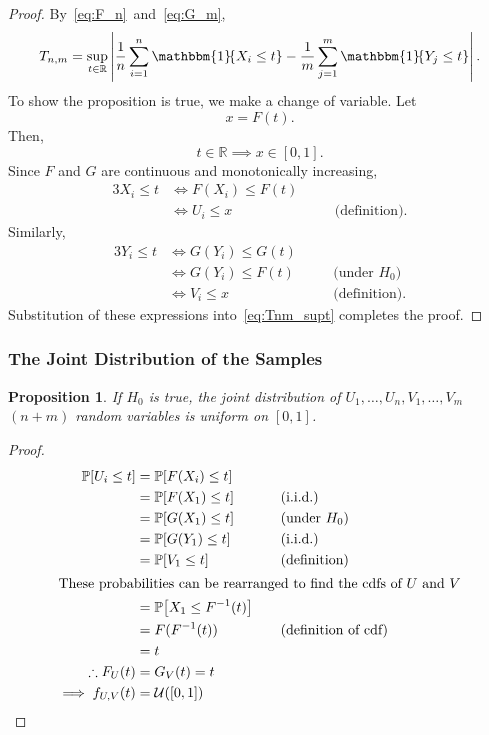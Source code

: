 \documentclass[letterpaper, reqno]{amsart}
\newtheorem{prop}{Proposition}[section]
\numberwithin{equation}{section}
\newcommand{\Prob}[1]{\mathbb{P}\mleft[#1\mright]}
\newcommand{\R}{\mathbb{R}}  %
\newcommand{\U}[2]{\mathcal{U}\mleft(\mleft[ #1, #2 \mright]\mright)}
\newcommand{\indic}[1]{\mathbbm{1}\!\mleft\{#1\mright\}} %
\newcommand{\iid}{i.i.d.}
\newcommand{\sumi}[2]{\sum_{#1=1}^{#2}}
\newcommand{\avg}[2]{\frac{1}{#2}\sumi{#1}{#2}}
\newcommand{\by}[1]{&\quad&\text{(#1)}}
\begin{document}
\begin{proof}
  By~\eqref{eq:F_n}~and~\eqref{eq:G_m},
  \begin{equation} \label{eq:Tnm_supt}
    T_{n,m} = \sup_{t \in \R} \left| \avg{i}{n} \indic{X_i \le t} - \avg{j}{m} \indic{Y_j \le t} \right|.
  \end{equation}
  To show the proposition is true, we make a change of variable. Let
    \[ x = F(t). \]
  Then,
    \[ t \in \R \implies x \in [0, 1]. \]
    Since $F$ and $G$ are continuous and monotonically increasing,
  \begin{alignat*}{3}
    X_i \le t &\iff F(X_i) \le F(t) \\
              &\iff U_i \le x \by{definition}.
  \end{alignat*}
  Similarly,
  \begin{alignat*}{3}
    Y_i \le t &\iff G(Y_i) \le G(t) \\
              &\iff G(Y_i) \le F(t) \by{under $H_0$} \\
              &\iff V_i \le x \by{definition}.
  \end{alignat*}
  Substitution of these expressions into~\eqref{eq:Tnm_supt} completes the
  proof. 
\end{proof}

\subsubsection{The Joint Distribution of the Samples}
\begin{prop} \label{prop:Tnm}
  If $H_0$ is true, the joint distribution of $U_1, \dots, U_n, V_1, \dots, V_m$
  $(n+m)$ random variables is uniform on $[0, 1]$.
\end{prop}

\begin{proof}
  \begin{alignat*}{3}
    \Prob{U_i \le t} &= \Prob{F(X_i) \le t} \\
                     &= \Prob{F(X_1) \le t} \by{\iid} \\
                     &= \Prob{G(X_1) \le t} \by{under $H_0$} \\
                     &= \Prob{G(Y_1) \le t} \by{\iid} \\
                     &= \Prob{V_1 \le t} \by{definition} \\
    \intertext{These probabilities can be rearranged to find the cdfs of $U$ and $V$}
                     &= \Prob{X_1 \le F^{-1}(t)} \\
                     &= F(F^{-1}(t)) \by{definition of cdf} \\
                     &= t \\
    \therefore F_U(t) &= G_V(t) = t \\
    \implies f_{U,V}(t) &= \U{0}{1} \tag*{\qedhere}
  \end{alignat*}
\end{proof}
\end{document}
